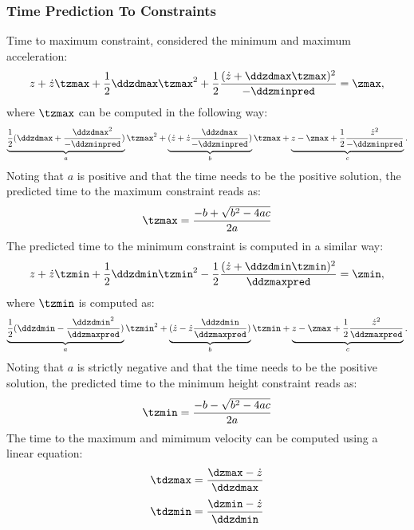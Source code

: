 \subsubsection{Time Prediction To Constraints}
Time to maximum constraint, considered the minimum and maximum acceleration:
\begin{equation}
    z + \dot{z}\tzmax + \frac{1}{2}\ddzdmax\tzmax^2 + \frac{1}{2}\frac{(\dot{z} +\ddzdmax\tzmax)^2}{-\ddzminpred}= \zmax,
\end{equation}
where $\tzmax$ can be computed in the following way:
\begin{equation}
    \underbrace{\frac{1}{2}(\ddzdmax + \frac{\ddzdmax^2}{-\ddzminpred})}_a\tzmax^2 + \underbrace{(\dot{z} + \dot{z}\frac{\ddzdmax}{-\ddzminpred})}_b\tzmax + \underbrace{z - \zmax + \frac{1}{2}\frac{\dot{z}^2}{-\ddzminpred}}_c.
\end{equation}
Noting that $a$ is positive and that the time needs to be the positive solution, the predicted time to the maximum constraint reads as:
\begin{equation}
    \tzmax=\frac{-b + \sqrt{b^2 -4ac}}{2a}
\end{equation}
\paraskip
The predicted time to the minimum constraint is computed in a similar way:
\begin{equation}
    z + \dot{z}\tzmin + \frac{1}{2}\ddzdmin\tzmin^2 - \frac{1}{2}\frac{(\dot{z} +\ddzdmin\tzmin)^2}{\ddzmaxpred}= \zmin,
\end{equation}
where $\tzmin$ is computed as:
\begin{equation}
    \underbrace{\frac{1}{2}(\ddzdmin - \frac{\ddzdmin^2}{\ddzmaxpred})}_a\tzmin^2 + \underbrace{(\dot{z} - \dot{z}\frac{\ddzdmin}{\ddzmaxpred})}_b\tzmin + \underbrace{z - \zmax + \frac{1}{2}\frac{\dot{z}^2}{\ddzmaxpred}}_c.
\end{equation}
Noting that $a$ is strictly negative and that the time needs to be the positive solution, the predicted time to the minimum height constraint reads as:
\begin{equation}
    \tzmin=\frac{-b - \sqrt{b^2 -4ac}}{2a}
\end{equation}
\paraskip
The time to the maximum and mimimum velocity can be computed using a linear equation:
\begin{equation}
	\tdzmax = \frac{\dzmax - \dot{z}}{\ddzdmax}
\end{equation}
\begin{equation}
	\tdzmin = \frac{\dzmin - \dot{z}}{\ddzdmin}
\end{equation}


